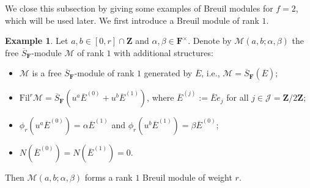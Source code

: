 \documentclass[11pt]{amsart}
\theoremstyle{definition}
\numberwithin{equation}{subsection}
\theoremstyle{plain}
\theoremstyle{plain}
\theoremstyle{plain}
\theoremstyle{plain}
\theoremstyle{plain}
\theoremstyle{plain}
\theoremstyle{plain}
\theoremstyle{plain}
\theoremstyle{plain}
\theoremstyle{plain}
\theoremstyle{plain}
\theoremstyle{plain}
\theoremstyle{definition}
\theoremstyle{definition}
\theoremstyle{definition}
\newtheorem{exam}[equation]{Example}
\theoremstyle{remark}
\renewcommand{\(}{\textup{(}}
\renewcommand{\)}{\textup{)}}
\newcommand{\Z}{\mathbf{Z}}
\newcommand{\F}{\mathbf{F}}
\newcommand{\barS}{\overline{S}}
\newcommand{\cM}{\mathcal{M}}
\newcommand{\Fil}{\mathrm{Fil}}
\newcommand{\cJ}{\mathcal{J}}
\newcommand{\barE}{\overline{E}}
\begin{document}
We close this subsection by giving some examples of Breuil modules for $f=2$, which will be used later. We first introduce a Breuil module of rank $1$.
\begin{exam}\label{exam: rank 1 BrMod}
Let $a,b\in[0,r]\cap\Z$ and $\alpha,\beta\in\F^\times$. Denote by $\cM(a,b;\alpha,\beta)$ the free $\barS_\F$-module $\cM$ of rank $1$ with additional structures:
\begin{itemize}[leftmargin=*]
\item $\cM$ is a free $\barS_\F$-module of rank $1$ generated by $\barE$, i.e., $\cM=\barS_{\F}(\barE)$;
\item $\Fil^r\cM=\barS_{\F}(u^a\barE^{(0)} +u^b \barE^{(1)})$, where $\barE^{(j)}:=\barE e_j$ for all $j\in\cJ=\Z/2\Z$;
\item $\phi_r(u^a\barE^{(0)})=\alpha\barE^{(1)}$ and $\phi_r(u^b\barE^{(1)})=\beta\barE^{(0)}$;
\item $N(\barE^{(0)})=N(\barE^{(1)})=0$.
\end{itemize}
Then $\cM(a,b;\alpha,\beta)$ forms a rank $1$ Breuil module of weight $r$.
\end{exam}
\end{document}
